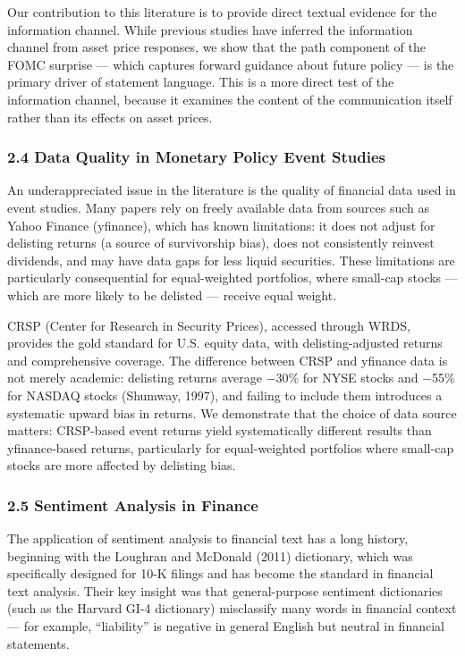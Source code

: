 \documentclass[
]{article}
\begin{document}
Our contribution to this literature is to provide direct textual
evidence for the information channel. While previous studies have
inferred the information channel from asset price responses, we show
that the path component of the FOMC surprise --- which captures forward
guidance about future policy --- is the primary driver of statement
language. This is a more direct test of the information channel, because
it examines the content of the communication itself rather than its
effects on asset prices.

\subsubsection{2.4 Data Quality in Monetary Policy Event
Studies}\label{data-quality-in-monetary-policy-event-studies}

An underappreciated issue in the literature is the quality of financial
data used in event studies. Many papers rely on freely available data
from sources such as Yahoo Finance (yfinance), which has known
limitations: it does not adjust for delisting returns (a source of
survivorship bias), does not consistently reinvest dividends, and may
have data gaps for less liquid securities. These limitations are
particularly consequential for equal-weighted portfolios, where
small-cap stocks --- which are more likely to be delisted --- receive
equal weight.

CRSP (Center for Research in Security Prices), accessed through WRDS,
provides the gold standard for U.S. equity data, with delisting-adjusted
returns and comprehensive coverage. The difference between CRSP and
yfinance data is not merely academic: delisting returns average −30\%
for NYSE stocks and −55\% for NASDAQ stocks (Shumway, 1997), and failing
to include them introduces a systematic upward bias in returns. We
demonstrate that the choice of data source matters: CRSP-based event
returns yield systematically different results than yfinance-based
returns, particularly for equal-weighted portfolios where small-cap
stocks are more affected by delisting bias.

\subsubsection{2.5 Sentiment Analysis in
Finance}\label{sentiment-analysis-in-finance}

The application of sentiment analysis to financial text has a long
history, beginning with the Loughran and McDonald (2011) dictionary,
which was specifically designed for 10-K filings and has become the
standard in financial text analysis. Their key insight was that
general-purpose sentiment dictionaries (such as the Harvard GI-4
dictionary) misclassify many words in financial context --- for example,
``liability'' is negative in general English but neutral in financial
statements.
\end{document}
